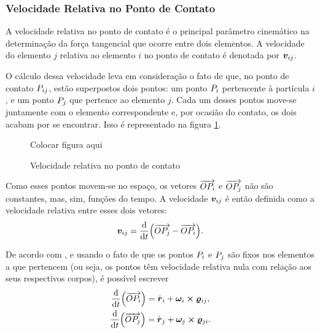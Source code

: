 \subsubsection*{Velocidade Relativa no Ponto de Contato}

A velocidade relativa no ponto de contato é o principal parâmetro cinemático na determinação da força tangencial que ocorre entre dois elementos. A velocidade do elemento \(j\) relativa ao elemento \(i\) no ponto de contato é denotada por \({\bm{v}}_{i j}\).

O cálculo dessa velocidade leva em consideração o fato de que, no ponto de contato \({P}_{i j}\), estão superpostos dois pontos: um ponto \({P}_{i}\) pertencente à partícula \(i\), e um ponto \({P}_{j}\) que pertence ao elemento \(j\). Cada um desses pontos move-se juntamente com o elemento correspondente e, por ocasião do contato, os dois acabam por se encontrar. Isso é representado na figura \ref{fig:relative_velocity}.

\begin{figure}[h]
	\caption{Velocidade relativa no ponto de contato}
	\centering
		\alert{Colocar figura aqui}
	\label{fig:relative_velocity}
\end{figure}

Como esses pontos movem-se no espaço, os vetores \(\overrightarrow{O {P}_{i}}\) e \(\overrightarrow{O {P}_{j}}\) não são constantes, mas, sim, funções do tempo. A velocidade \({\bm{v}}_{i j}\) é então definida como a velocidade relativa entre esses dois vetores:
\begin{equation*}
	{\bm{v}}_{i j} = \dv{t}(\overrightarrow{O {P}_{j}} - \overrightarrow{O {P}_{i}}).
\end{equation*}

De acordo com , e usando o fato de que os pontos \({P}_{i}\) e \({P}_{j}\) são fixos nos elementos a que pertencem (ou seja, os pontos têm velocidade relativa nula com relação aos seus respectivos corpos), é possível escrever
\begin{gather*}
	\dv{t}(\vectorFromPoints{\originPoint}{\contactPointi}) = \velocityi + \angularVelocityi\cross\contactVectorij, \\
	\dv{t}(\vectorFromPoints{\originPoint}{\contactPointj}) = \velocityj + \angularVelocityj\cross\contactVectorji.
\end{gather*}

